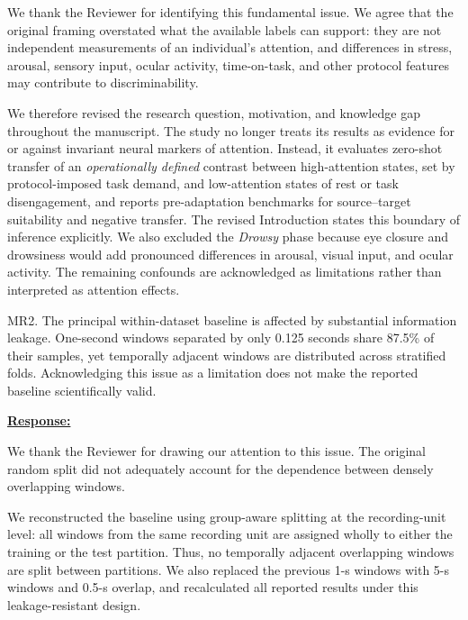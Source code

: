 \documentclass{article}
\begin{document}
We thank the Reviewer for identifying this fundamental issue. We agree that the
original framing overstated what the available labels can support: they are not
independent measurements of an individual's attention, and differences in
stress, arousal, sensory input, ocular activity, time-on-task, and other
protocol features may contribute to discriminability.

We therefore revised the research question, motivation, and knowledge gap
throughout the manuscript. The study no longer treats its results as evidence
for or against invariant neural markers of attention. Instead, it evaluates
zero-shot transfer of an \emph{operationally defined} contrast between
high-attention states, set by protocol-imposed task demand, and low-attention
states of rest or task disengagement, and reports pre-adaptation benchmarks
for source--target suitability and negative transfer. The revised Introduction
states this boundary of inference explicitly. We also excluded the
\textit{Drowsy} phase because eye closure and drowsiness would add pronounced
differences in arousal, visual input, and ocular activity. The remaining
confounds are acknowledged as limitations rather than interpreted as attention
effects.

\vspace{0.3cm}


\begin{cmt}{}{}

MR2. The principal within-dataset baseline is affected by substantial
information leakage. One-second windows separated by only 0.125 seconds share
87.5\% of their samples, yet temporally adjacent windows are distributed across
stratified folds. Acknowledging this issue as a limitation does not make the
reported baseline scientifically valid.

\end{cmt}
\vspace{0.1cm}
\noindent
\underline{\textbf{Response:}}
\vspace{0.2cm}

We thank the Reviewer for drawing our attention to this issue. The original
random split did not adequately account for the dependence between densely
overlapping windows.

We reconstructed the baseline using group-aware splitting at the recording-unit
level: all windows from the same recording unit are assigned wholly to either
the training or the test partition. Thus, no temporally adjacent overlapping
windows are split between partitions. We also replaced the previous 1-s windows
with 5-s windows and 0.5-s overlap, and recalculated all reported results under
this leakage-resistant design.
\end{document}
